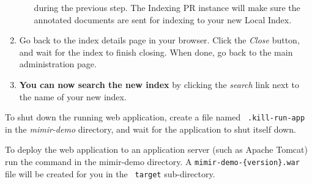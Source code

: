 \begin{enumerate}
\begin{enumerate}
    during the previous step. The \Mimir{} Indexing PR instance will make
    sure the annotated documents are sent for indexing to your new Local Index.
  \end{enumerate}
  \item Go back to the index details page in your browser. Click the {\em Close}
  button, and wait for the index to finish closing. When done, go back to the
  main administration page. 
  \item {\bf You can now search the new index} by clicking the {\em search} link
  next to the name of your new index.
\end{enumerate}

To shut down the running web application, create a file named {\tt
.kill-run-app} in the {\em mimir-demo} directory, and wait for the application
to shut itself down.

To deploy the \Mimir{} web application to an application server (such as Apache
Tomcat) run the  command in the mimir-demo directory. A
{\tt mimir-demo-\{version\}.war} file will be created for you in the {\tt
target} sub-directory.
